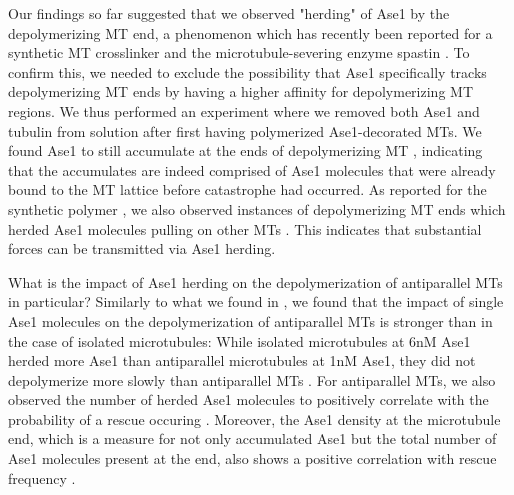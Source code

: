 Our findings so far suggested that we observed "herding" of Ase1 by the depolymerizing MT end, a phenomenon which has recently been reported for a synthetic MT crosslinker \parencite{Drechsler2019} and the microtubule-severing enzyme spastin . To confirm this, we needed to exclude the possibility that Ase1 specifically tracks depolymerizing MT ends by having a higher affinity for depolymerizing MT regions. We thus performed an experiment where we removed both Ase1 and tubulin from solution after first having polymerized Ase1-decorated MTs. We found Ase1 to still accumulate at the ends of depolymerizing MT , indicating that the accumulates are indeed comprised of Ase1 molecules that were already bound to the MT lattice before catastrophe had occurred. As reported for the synthetic polymer \parencite{Drechsler2019}, we also observed instances of depolymerizing MT ends which herded Ase1 molecules pulling on other MTs . This indicates that substantial forces can be transmitted via Ase1 herding.\par

What is the impact of Ase1 herding on the depolymerization of antiparallel MTs in particular? Similarly to what we found in , we found that the impact of single Ase1 molecules on the depolymerization of antiparallel MTs is stronger than in the case of isolated microtubules: While isolated microtubules at 6nM Ase1 herded more Ase1 than antiparallel microtubules at 1nM Ase1, they did not depolymerize more slowly than antiparallel MTs . For antiparallel MTs, we also observed the number of herded Ase1 molecules to positively correlate with the probability of a rescue occuring . Moreover, the Ase1 density at the microtubule end, which is a measure for not only accumulated Ase1 but the total number of Ase1 molecules present at the end, also shows a positive correlation with rescue frequency .\par

